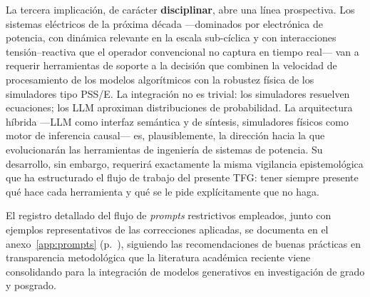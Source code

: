 La tercera implicación, de carácter \textbf{disciplinar}, abre una línea
prospectiva. Los sistemas eléctricos de la próxima década ---dominados por
electrónica de potencia, con dinámica relevante en la escala sub-cíclica y
con interacciones tensión--reactiva que el operador convencional no captura
en tiempo real--- van a requerir herramientas de soporte a la decisión que
combinen la velocidad de procesamiento de los modelos algorítmicos con la
robustez física de los simuladores tipo PSS/E. La integración no es trivial:
los simuladores resuelven ecuaciones; los LLM aproximan distribuciones de
probabilidad. La arquitectura híbrida ---LLM como interfaz semántica y de
síntesis, simuladores físicos como motor de inferencia causal--- es,
plausiblemente, la dirección hacia la que evolucionarán las herramientas de
ingeniería de sistemas de potencia. Su desarrollo, sin embargo, requerirá
exactamente la misma vigilancia epistemológica que ha estructurado el flujo
de trabajo del presente TFG: tener siempre presente qué hace cada
herramienta y qué se le pide explícitamente que no haga.

El registro detallado del flujo de \textit{prompts} restrictivos empleados,
junto con ejemplos representativos de las correcciones aplicadas, se
documenta en el anexo~\ref{app:prompts}
(p.~\pageref{app:prompts}), siguiendo las recomendaciones de buenas
prácticas en transparencia metodológica que la literatura académica reciente
viene consolidando para la integración de modelos generativos en
investigación de grado y posgrado.